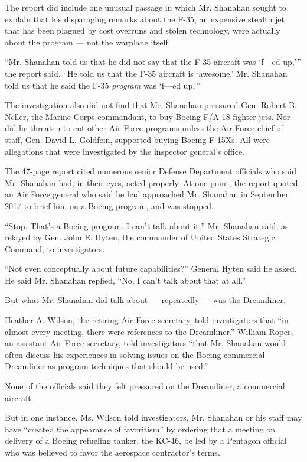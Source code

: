 The report did include one unusual passage in which Mr. Shanahan sought
to explain that his disparaging remarks about the F-35, an expensive
stealth jet that has been plagued by cost overruns and stolen
technology, were actually about the program --- not the warplane itself.

``Mr. Shanahan told us that he did not say that the F-35 aircraft was
`f---ed up,''' the report said. ``He told us that the F-35 aircraft is
`awesome.' Mr. Shanahan told us that he said the F-35 \emph{program} was
`f---ed up.'''

The investigation also did not find that Mr. Shanahan pressured Gen.
Robert B. Neller, the Marine Corps commandant, to buy Boeing F/A-18
fighter jets. Nor did he threaten to cut other Air Force programs unless
the Air Force chief of staff, Gen. David L. Goldfein, supported buying
Boeing F-15Xs. All were allegations that were investigated by the
inspector general's office.

The
\href{https://media.defense.gov/2019/Apr/25/2002120979/-1/-1/1/DODIG-\%202019-082.PDF}{47-page
report} cited numerous senior Defense Department officials who said Mr.
Shanahan had, in their eyes, acted properly. At one point, the report
quoted an Air Force general who said he had approached Mr. Shanahan in
September 2017 to brief him on a Boeing program, and was stopped.

``Stop. That's a Boeing program. I can't talk about it,'' Mr. Shanahan
said, as relayed by Gen. John E. Hyten, the commander of United States
Strategic Command, to investigators.

``Not even conceptually about future capabilities?'' General Hyten said
he asked. He said Mr. Shanahan replied, ``No, I can't talk about that at
all.''

But what Mr. Shanahan did talk about --- repeatedly --- was the
Dreamliner.

Heather A. Wilson, the
\href{https://www.nytimes.com/2019/03/08/us/politics/heather-wilson-air-force-.html}{retiring
Air Force secretary}, told investigators that ``in almost every meeting,
there were references to the Dreamliner.'' William Roper, an assistant
Air Force secretary, told investigators ``that Mr. Shanahan would often
discuss his experiences in solving issues on the Boeing commercial
Dreamliner as program techniques that should be used.''

None of the officials said they felt pressured on the Dreamliner, a
commercial aircraft.

But in one instance, Ms. Wilson told investigators, Mr. Shanahan or his
staff may have ``created the appearance of favoritism'' by ordering that
a meeting on delivery of a Boeing refueling tanker, the KC-46, be led by
a Pentagon official who was believed to favor the aerospace contractor's
terms.

